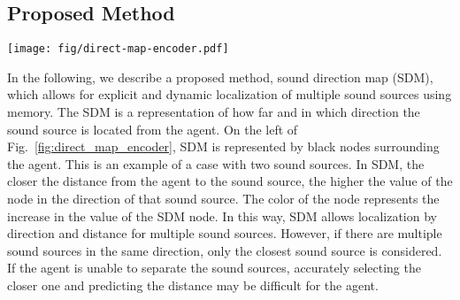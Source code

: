 \subsection{Proposed Method}


\begin{figure*}[t]
    \begin{center}
        \centering
        \texttt{[image: fig/direct-map-encoder.pdf]}
        \caption{
            The application of the network for SDM creation to the network architecture of the AV-Nav \cite{chen2020soundspaces}.
            SDM Encoder is the proposed network architecture for SDM creation.
            Here, $\boldsymbol{a}_{t}$ and $\hat{\boldsymbol{d}}_t$ represent one-hot vector representing action and SDM prediction at time $t$, respectively.
            The input includes not only the sound observation $A_t$ but also one-hot vector $\boldsymbol{a}_{t-1}$ representing the previous action and the prediction of the previous SDM $\hat{\boldsymbol{d}}_{t-1}$.
        }
        \label{fig:direct_map_encoder}
    \end{center}
\end{figure*}

In the following, we describe a proposed method, sound direction map (SDM), which allows for explicit and dynamic localization of multiple sound sources using memory.
The SDM is a representation of how far and in which direction the sound source is located from the agent.
On the left of Fig.~\ref{fig:direct_map_encoder}, SDM is represented by black nodes surrounding the agent.
This is an example of a case with two sound sources.
In SDM, the closer the distance from the agent to the sound source, the higher the value of the node in the direction of that sound source.
The color of the node represents the increase in the value of the SDM node.
In this way, SDM allows localization by direction and distance for multiple sound sources.
However, if there are multiple sound sources in the same direction, only the closest sound source is considered.
If the agent is unable to separate the sound sources, accurately selecting the closer one and predicting the distance may be difficult for the agent.

